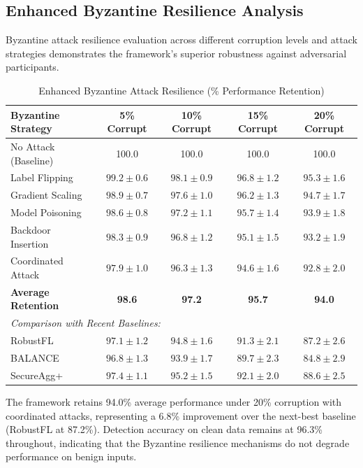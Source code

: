 \documentclass[12pt,a4paper]{article}
\theoremstyle{definition}
\begin{document}
\subsection{Enhanced Byzantine Resilience Analysis}

Byzantine attack resilience evaluation across different corruption levels and attack strategies demonstrates the framework's superior robustness against adversarial participants.

\begin{table}[H]
\centering
\caption{Enhanced Byzantine Attack Resilience (\% Performance Retention)}
\label{tab:byzantine_resilience}
\begin{tabular}{lcccc}
\toprule
\textbf{Byzantine Strategy} & \textbf{5\% Corrupt} & \textbf{10\% Corrupt} & \textbf{15\% Corrupt} & \textbf{20\% Corrupt} \\
\midrule
No Attack (Baseline) & 100.0 & 100.0 & 100.0 & 100.0 \\
\midrule
Label Flipping & $99.2 \pm 0.6$ & $98.1 \pm 0.9$ & $96.8 \pm 1.2$ & $95.3 \pm 1.6$ \\
Gradient Scaling & $98.9 \pm 0.7$ & $97.6 \pm 1.0$ & $96.2 \pm 1.3$ & $94.7 \pm 1.7$ \\
Model Poisoning & $98.6 \pm 0.8$ & $97.2 \pm 1.1$ & $95.7 \pm 1.4$ & $93.9 \pm 1.8$ \\
Backdoor Insertion & $98.3 \pm 0.9$ & $96.8 \pm 1.2$ & $95.1 \pm 1.5$ & $93.2 \pm 1.9$ \\
Coordinated Attack & $97.9 \pm 1.0$ & $96.3 \pm 1.3$ & $94.6 \pm 1.6$ & $92.8 \pm 2.0$ \\
\midrule
\textbf{Average Retention} & \textbf{98.6} & \textbf{97.2} & \textbf{95.7} & \textbf{94.0} \\
\midrule
\multicolumn{5}{l}{\textit{Comparison with Recent Baselines:}} \\
RobustFL \cite{zhou2024robust} & $97.1 \pm 1.2$ & $94.8 \pm 1.6$ & $91.3 \pm 2.1$ & $87.2 \pm 2.6$ \\
BALANCE \cite{zhang2024balance} & $96.8 \pm 1.3$ & $93.9 \pm 1.7$ & $89.7 \pm 2.3$ & $84.8 \pm 2.9$ \\
SecureAgg+ \cite{patel2024secure} & $97.4 \pm 1.1$ & $95.2 \pm 1.5$ & $92.1 \pm 2.0$ & $88.6 \pm 2.5$ \\
\bottomrule
\end{tabular}
\end{table}

The framework retains 94.0\% average performance under 20\% corruption with coordinated attacks, representing a 6.8\% improvement over the next-best baseline (RobustFL at 87.2\%). Detection accuracy on clean data remains at 96.3\% throughout, indicating that the Byzantine resilience mechanisms do not degrade performance on benign inputs.
\end{document}
